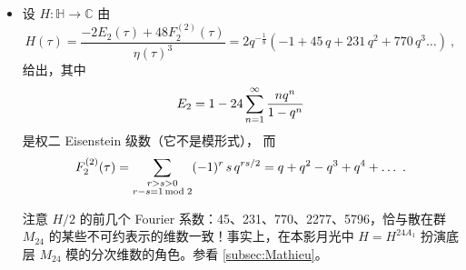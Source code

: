 \documentclass[11pt,a4paper,fontset=windows]{ctexart}
\numberwithin{equation}{section}
\newcommand{\CC}{\mathbb{C}}
\newcommand{\HH}{\mathbb{H}}
\def\t{\tau}
\newcommand{\ex}{\operatorname{e}} %
\newcommand{\be}{\begin{equation}}
\newcommand{\ee}{\end{equation}}
\newcommand{\bem}{\begin{pmatrix}}
\newcommand{\eem}{\end{pmatrix}}
\begin{document}
\begin{itemize}
写 $\widehat H_r^{3E_8}(\t) = H_r^{3E_8} +(g_r^{3E_8})^\ast$，则
\begin{align}
\bem \widehat H_1^{3E_8}\\\widehat H_7^{3E_8}\eem(\t+1) =\bem \ex(-{1\over 120}) & 0 \\ 0 &\ex(-{49\over 120}) \eem \bem \widehat H_1^{3E_8}\\\widehat H_7^{3E_8}\eem(\t)
\end{align}
以及
\begin{align}
\bem \widehat H_1^{3E_8}\\\widehat H_7^{3E_8}\eem\left(-{1\over \t}\right) =\tau^{1/2} i^{3/2} \bem {1\over 2}\sqrt{1-{1\over \sqrt{5}}} &  {1\over 2}\sqrt{1+{1\over \sqrt{5}}}\\  {1\over 2}\sqrt{1-{1\over \sqrt{5}}} &- {1\over 2}\sqrt{1-{1\over \sqrt{5}}} \eem \bem \widehat H_1^{3E_8}\\\widehat H_7^{3E_8}\eem(\t)
\end{align}
{\sloppy 此外，$H_i^{3E_8}$ 可以看作由模拟 Jacobi 形式 $\psi^{3E_8}(\t,z):= \sum_{r\in I^{3E_8}} H_r^{3E_8}\sum_{a\in A}\tilde \theta^{3E_8}_{a\,r}$ 的 theta 复合得到。更具体地说，$\hat \psi^{3E_8}(\t,z):=\sum_{r\in I^{3E_8}} \widehat H_r^{3E_8}\sum_{a\in A}\tilde \theta^{3E_8}_{a\,r}$ 关于 $\t$ 非全纯，并按权 1、指标 30 的 Jacobi 形式变换。
正如记号所示，$H_r^{3E_8}$ 编码对应于根系统 $3E_8$ 的 Niemeier 格 $N$ 的本影月光情形背后的本影月光模的分次维数，我们将在 \S\ref{sec:umbral} 中讨论。\par}

\item 设 $H: \HH \to \CC$ 由
\be\label{second_def_H}
H(\t) = \frac{-2 E_2(\t) + 48 F_2^{(2)}(\t)}{\eta(\t)^3}=2 q^{-\frac{1}{8}} \left( -1 + 45\, q+ 231\, q^2 + 770\,q^3\dots \right)~,
\ee
给出，其中
$$E_2 = 1- 24\sum_{n=1}^\infty {nq^n \over 1-q^n }$$ 是权二 Eisenstein 级数（它不是模形式），
而
$$
F_2^{(2)}(\t)= \sum_{\substack{r>s>0\\ r-s=1\, {\rm mod }\; 2 }} (-1)^{r} \,s \,q^{rs/2} = q+q^2-q^3+q^4+\dots ~.
$$


注意 $H/2$ 的前几个 Fourier 系数：45、231、770、2277、5796，恰与散在群 $M_{24}$ 的某些不可约表示的维数一致！事实上，在本影月光中 $H = H^{24A_1}$ 扮演底层 $M_{24}$ 模的分次维数的角色。参看 \ref{subsec:Mathieu}。


\end{itemize}
\end{document}
